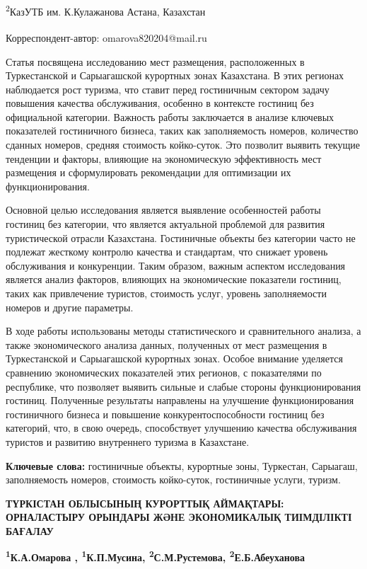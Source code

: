 \textsuperscript{2}КазУТБ им. К.Кулажанова Астана, Казахстан

{\bfseries \textsuperscript{\envelope }}Корреспондент-автор: omarova820204@mail.ru

Статья посвящена исследованию мест размещения, расположенных в
Туркестанской и Сарыагашской курортных зонах Казахстана. В этих регионах
наблюдается рост туризма, что ставит перед гостиничным сектором задачу
повышения качества обслуживания, особенно в контексте гостиниц без
официальной категории. Важность работы заключается в анализе ключевых
показателей гостиничного бизнеса, таких как заполняемость номеров,
количество сданных номеров, средняя стоимость койко-суток. Это позволит
выявить текущие тенденции и факторы, влияющие на экономическую
эффективность мест размещения и сформулировать рекомендации для
оптимизации их функционирования.

Основной целью исследования является выявление особенностей работы
гостиниц без категории, что является актуальной проблемой для развития
туристической отрасли Казахстана. Гостиничные объекты без категории
часто не подлежат жесткому контролю качества и стандартам, что снижает
уровень обслуживания и конкуренции. Таким образом, важным аспектом
исследования является анализ факторов, влияющих на экономические
показатели гостиниц, таких как привлечение туристов, стоимость услуг,
уровень заполняемости номеров и другие параметры.

В ходе работы использованы методы статистического и сравнительного
анализа, а также экономического анализа данных, полученных от мест
размещения в Туркестанской и Сарыагашской курортных зонах. Особое
внимание уделяется сравнению экономических показателей этих регионов, с
показателями по республике, что позволяет выявить сильные и слабые
стороны функционирования гостиниц. Полученные результаты направлены на
улучшение функционирования гостиничного бизнеса и повышение
конкурентоспособности гостиниц без категорий, что, в свою очередь,
способствует улучшению качества обслуживания туристов и развитию
внутреннего туризма в Казахстане.

{\bfseries Ключевые слова:} гостиничные объекты, курортные зоны, Туркестан,
Сарыагаш, заполняемость номеров, стоимость койко-суток, гостиничные
услуги, туризм.

{\bfseries ТҮРКІСТАН ОБЛЫСЫНЫҢ КУРОРТТЫҚ АЙМАҚТАРЫ: ОРНАЛАСТЫРУ ОРЫНДАРЫ
ЖӘНЕ ЭКОНОМИКАЛЫҚ ТИІМДІЛІКТІ БАҒАЛАУ}

{\bfseries \textsuperscript{1}К.А.Омарова\textsuperscript{\envelope } ,
\textsuperscript{1}К.П.Мусина, \textsuperscript{2}С.М.Рустемова,
\textsuperscript{2}Е.Б.Абеуханова}

